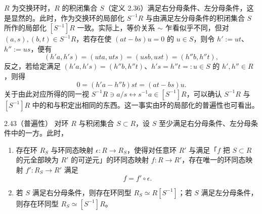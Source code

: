 $R$ 为交换环时，$R$ 的积闭集合 $S$（定义 2.36）满足右分母条件、左分母条件，这是显然的。此时，作为交换环的局部化 $S^{-1}R$ 与由满足左分母条件的积闭集合 $S$ 所作的局部化 $[S^{-1}]R$ 一致。实际上，等价关系 $\sim$ 乍看似乎不同，但对 $(a,s),(b,t)\in S^{-1}R$，若存在使 $(at-bs)u=0$ 的 $u\in S$，则令 $h':=ut$、$h'':=us$，便有
\[
  (h'a,h's)=(uta,uts)=(usb,ust)=(h''b,h''t),
\]
反之，若给定满足 $(h'a,h's)=(h''b,h''t)$、$h's=h''t=:u\in S$ 的 $h',h''\in R$，则得
\[
  0=(h'a-h''b)st=(at-bs)u .
\]
关于由此对应所得的同一视 $S^{-1}R\ni a/s\leftrightarrow s^{-1}a\in[S^{-1}]R$，可以确认 $S^{-1}R$ 与 $[S^{-1}]R$ 中的和与积定出相同的东西。这一事实由环的局部化的普遍性也可看出。


\begin{theorem}{2.43}（普遍性） 对环 $R$ 与积闭集合 $S\subset R$，设 $S$ 至少满足右分母条件、左分母条件中的一方。此时，
\begin{enumerate}[label=(\roman*), leftmargin=*]
  \item 存在环 $R_S$ 与环同态映射 $\epsilon\colon R\to R_S$，使得对任意环 $R'$ 与满足「$f$ 把 $S\subset R$ 的元全部映为 $R'$ 的可逆元」的环同态映射 $f\colon R\to R'$，存在唯一的环同态映射 $f'\colon R_S\to R'$ 满足
  \[
    f=f'\circ\epsilon .
  \]
  \item 若 $S$ 满足右分母条件，则存在环同型 $R_S\simeq R[S^{-1}]$；若 $S$ 满足左分母条件，则存在环同型 $R_S\simeq[S^{-1}]R$。
\end{enumerate}
\end{theorem}

